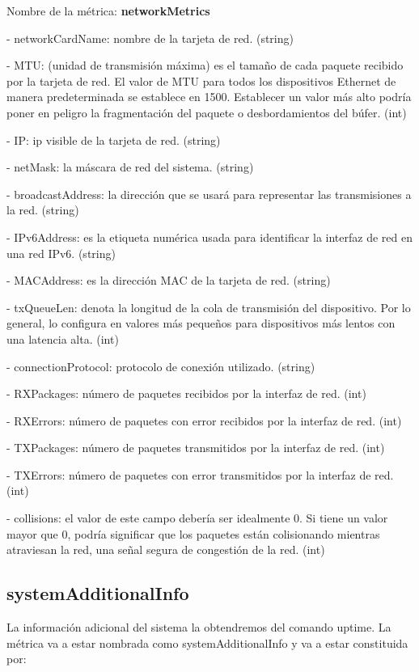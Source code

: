 \documentclass[ spanish, a4paper, 12pt, oneside]{report}
\begin{document}
Nombre de la métrica: \textbf{networkMetrics}

\hyp{} networkCardName: nombre de la tarjeta de red. (string)

\hyp{} MTU: (unidad de transmisión máxima) es el tamaño de cada paquete recibido por la tarjeta de red. El valor de MTU para todos 
los dispositivos Ethernet de manera predeterminada se establece en 1500. Establecer un valor más alto podría poner en peligro 
la fragmentación del paquete o desbordamientos del búfer. (int)

\hyp{} IP: ip visible de la tarjeta de red. (string)

\hyp{} netMask: la máscara de red del sistema. (string)

\hyp{} broadcastAddress: la dirección que se usará para representar las transmisiones a la red. (string)

\hyp{} IPv6Address: es la etiqueta numérica usada para identificar la interfaz de red en una red IPv6. (string)

\hyp{} MACAddress: es la dirección MAC de la tarjeta de red. (string)

\hyp{} txQueueLen: denota la longitud de la cola de transmisión del dispositivo. Por lo general, lo configura en valores más pequeños 
para dispositivos más lentos con una latencia alta. (int)

\hyp{} connectionProtocol: protocolo de conexión utilizado. (string)

\hyp{} RXPackages: número de paquetes recibidos por la interfaz de red. (int)

\hyp{} RXErrors: número de paquetes con error recibidos por la interfaz de red. (int)

\hyp{} TXPackages: número de paquetes transmitidos por la interfaz de red. (int)

\hyp{} TXErrors: número de paquetes con error transmitidos por la interfaz de red. (int)

\hyp{} collisions: el valor de este campo debería ser idealmente 0. Si tiene un valor mayor que 0, podría significar que los paquetes
están colisionando mientras atraviesan la red, una señal segura de congestión de la red. (int)

\subsection{systemAdditionalInfo}
La información adicional del sistema la obtendremos del comando uptime.
La métrica va a estar nombrada como systemAdditionalInfo y va a estar constituida por:\\
  
\end{document}
